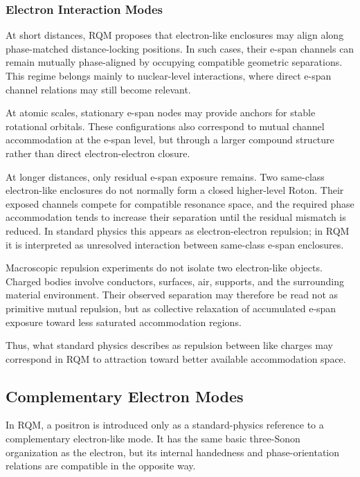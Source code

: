 \documentclass[11pt,a4paper]{article}
\begin{document}

\subsubsection{Electron Interaction Modes}

At short distances, RQM proposes that electron-like enclosures may align along phase-matched distance-locking positions. In such cases, their e-span channels can remain mutually phase-aligned by occupying compatible geometric separations. This regime belongs mainly to nuclear-level interactions, where direct e-span channel relations may still become relevant.

At atomic scales, stationary e-span nodes may provide anchors for stable rotational orbitals. These configurations also correspond to mutual channel accommodation at the e-span level, but through a larger compound structure rather than direct electron-electron closure.

At longer distances, only residual e-span exposure remains. Two same-class electron-like enclosures do not normally form a closed higher-level Roton. Their exposed channels compete for compatible resonance space, and the required phase accommodation tends to increase their separation until the residual mismatch is reduced. In standard physics this appears as electron-electron repulsion; in RQM it is interpreted as unresolved interaction between same-class e-span enclosures.

Macroscopic repulsion experiments do not isolate two electron-like objects. Charged bodies involve conductors, surfaces, air, supports, and the surrounding material environment. Their observed separation may therefore be read not as primitive mutual repulsion, but as collective relaxation of accumulated e-span exposure toward less saturated accommodation regions.

Thus, what standard physics describes as repulsion between like charges may correspond in RQM to attraction toward better available accommodation space.


\subsection{Complementary Electron Modes}

In RQM, a positron is introduced only as a standard-physics reference to a complementary electron-like mode. It has the same basic three-Sonon organization as the electron, but its internal handedness and phase-orientation relations are compatible in the opposite way.
\end{document}
